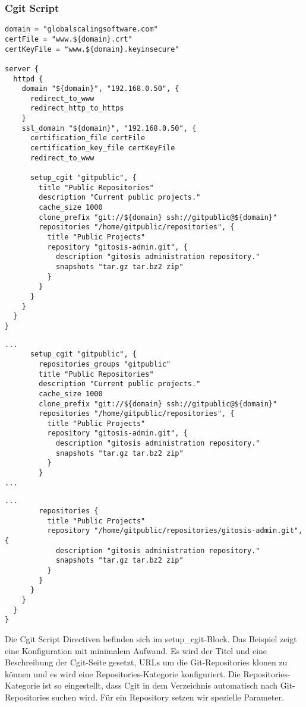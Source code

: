 \subsubsection{Cgit Script}

\begin{lstlisting}[style=Java, caption=Beispiel Cgit Script mit Scan-Path]
domain = "globalscalingsoftware.com"
certFile = "www.${domain}.crt"
certKeyFile = "www.${domain}.keyinsecure"

server {
  httpd {
    domain "${domain}", "192.168.0.50", {
      redirect_to_www
      redirect_http_to_https
    }
    ssl_domain "${domain}", "192.168.0.50", {
      certification_file certFile
      certification_key_file certKeyFile
      redirect_to_www

      setup_cgit "gitpublic", {
        title "Public Repositories"
        description "Current public projects."
        cache_size 1000
        clone_prefix "git://${domain} ssh://gitpublic@${domain}"
        repositories "/home/gitpublic/repositories", {
          title "Public Projects"
          repository "gitosis-admin.git", {
            description "gitosis administration repository."
            snapshots "tar.gz tar.bz2 zip"
          }
        }
      }
    }
  }
}
\end{lstlisting}

\begin{lstlisting}[style=Java, caption=Beispiel Cgit Script mit Scan-Path]
...
      setup_cgit "gitpublic", {
        repositories_groups "gitpublic"
        title "Public Repositories"
        description "Current public projects."
        cache_size 1000
        clone_prefix "git://${domain} ssh://gitpublic@${domain}"
        repositories "/home/gitpublic/repositories", {
          title "Public Projects"
          repository "gitosis-admin.git", {
            description "gitosis administration repository."
            snapshots "tar.gz tar.bz2 zip"
          }
        }
...
\end{lstlisting}


\begin{lstlisting}[style=Java, caption=Beispiel Cgit Script ohne Scan-Path]
...
        repositories {
          title "Public Projects"
          repository "/home/gitpublic/repositories/gitosis-admin.git", {
            description "gitosis administration repository."
            snapshots "tar.gz tar.bz2 zip"
          }
        }
      }
    }
  }
}
\end{lstlisting}

Die Cgit Script Directiven befinden sich im setup\_cgit-Block. Das Beispiel
zeigt eine Konfiguration mit minimalem Aufwand. Es wird der Titel und eine
Beschreibung der Cgit-Seite gesetzt, URLs um die Git-Repositories klonen zu
können und es wird eine Repositories-Kategorie konfiguriert. Die
Repositories-Kategorie ist so eingestellt, dass Cgit in dem Verzeichnis
automatisch nach Git-Repositories suchen wird. Für ein Repository setzen wir
spezielle Parameter.

